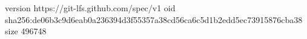 version https://git-lfs.github.com/spec/v1
oid sha256:de06b3c9d6eab0a236394d3f55357a38cd56ca6c5d1b2edd5ec73915876cba38
size 496748

